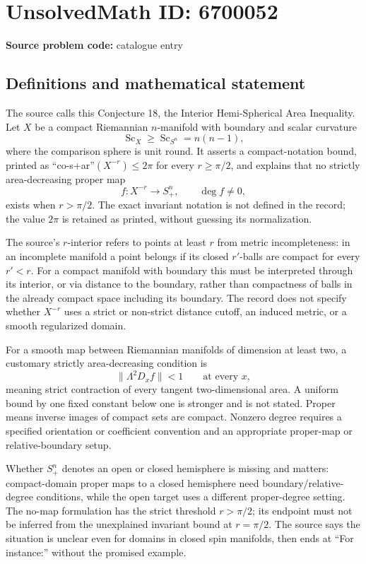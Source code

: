 \documentclass[11pt]{article}
\begin{document}
\section*{UnsolvedMath ID: 6700052}
\textbf{Source problem code:} catalogue entry
\subsection{Definitions and mathematical statement}
The source calls this Conjecture 18, the Interior Hemi-Spherical Area Inequality. Let $X$ be a compact Riemannian $n$-manifold with boundary and scalar curvature
\[
\operatorname{Sc}_X\geq\operatorname{Sc}_{S^n}=n(n-1),
\]
where the comparison sphere is unit round. It asserts a compact-notation bound, printed as ``co-s+ar''$(X^{-r})\leq2\pi$ for every $r\geq\pi/2$, and explains that no strictly area-decreasing proper map
\[
f:X^{-r}\longrightarrow S^n_+,\qquad \deg f\ne0,
\]
exists when $r>\pi/2$. The exact invariant notation is not defined in the record; the value $2\pi$ is retained as printed, without guessing its normalization.

The source's $r$-interior refers to points at least $r$ from metric incompleteness: in an incomplete manifold a point belongs if its closed $r'$-balls are compact for every $r'<r$. For a compact manifold with boundary this must be interpreted through its interior, or via distance to the boundary, rather than compactness of balls in the already compact space including its boundary. The record does not specify whether $X^{-r}$ uses a strict or non-strict distance cutoff, an induced metric, or a smooth regularized domain.

For a smooth map between Riemannian manifolds of dimension at least two, a customary strictly area-decreasing condition is
\[
\|\Lambda^2D_xf\|<1\qquad\text{at every }x,
\]
meaning strict contraction of every tangent two-dimensional area. A uniform bound by one fixed constant below one is stronger and is not stated. Proper means inverse images of compact sets are compact. Nonzero degree requires a specified orientation or coefficient convention and an appropriate proper-map or relative-boundary setup.

Whether $S^n_+$ denotes an open or closed hemisphere is missing and matters: compact-domain proper maps to a closed hemisphere need boundary/relative-degree conditions, while the open target uses a different proper-degree setting. The no-map formulation has the strict threshold $r>\pi/2$; its endpoint must not be inferred from the unexplained invariant bound at $r=\pi/2$. The source says the situation is unclear even for domains in closed spin manifolds, then ends at ``For instance:'' without the promised example.
\end{document}

